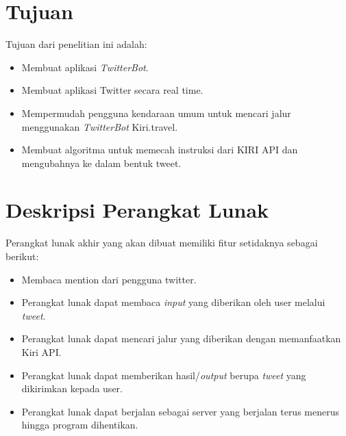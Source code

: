 \documentclass[a4paper,twoside]{article}
\begin{document}
\section{Tujuan}
Tujuan dari penelitian ini adalah:
\begin{itemize}
	\item Membuat aplikasi \textit{TwitterBot}.
	\item Membuat aplikasi Twitter secara real time.
	\item Mempermudah pengguna kendaraan umum untuk mencari jalur menggunakan \textit{TwitterBot} Kiri.travel.
	\item Membuat algoritma untuk memecah instruksi dari KIRI API dan mengubahnya ke dalam bentuk tweet.
\end{itemize}

\section{Deskripsi Perangkat Lunak}
Perangkat lunak akhir yang akan dibuat memiliki fitur setidaknya sebagai berikut:
\begin{itemize}
	\item Membaca mention dari pengguna twitter.
	\item Perangkat lunak dapat membaca \textit{input} yang diberikan oleh user melalui \textit{tweet}.
	\item Perangkat lunak dapat mencari jalur yang diberikan dengan memanfaatkan Kiri API.
	\item Perangkat lunak dapat memberikan hasil/\textit{output} berupa \textit{tweet} yang dikirimkan kepada user.
	\item Perangkat lunak dapat berjalan sebagai server yang berjalan terus menerus hingga program dihentikan.
\end{itemize}
\end{document}
